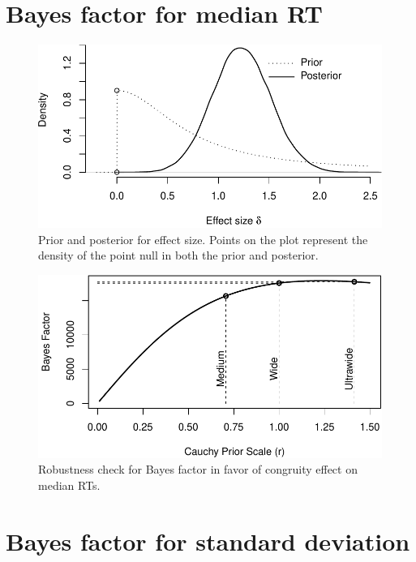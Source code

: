 \documentclass[english,floatsintext,doc]{apa6}
\theoremstyle{definition}
\theoremstyle{definition}
\theoremstyle{definition}
\theoremstyle{remark}
\begin{document}
\section{Bayes factor for median RT}\label{bayes-factor-for-median-rt}

\begin{figure}
\centering
\includegraphics{supplement_files/figure-latex/medianPosterior-1.pdf}
\caption{\label{fig:medianPosterior}Prior and posterior for effect size.
Points on the plot represent the density of the point null in both the
prior and posterior.}
\end{figure}

\begin{figure}
\centering
\includegraphics{supplement_files/figure-latex/medianRobustness-1.pdf}
\caption{\label{fig:medianRobustness}Robustness check for Bayes factor in
favor of congruity effect on median RTs.}
\end{figure}

\section{Bayes factor for standard
deviation}\label{bayes-factor-for-standard-deviation}
\end{document}
